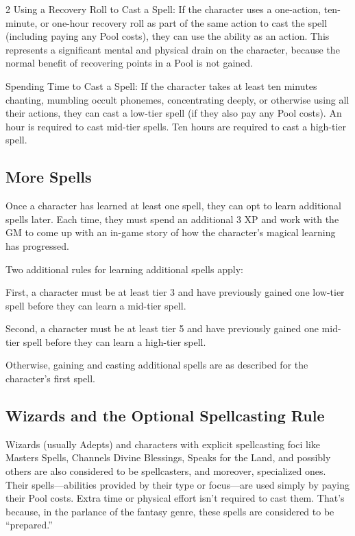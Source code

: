 \begin{multicols}{2}
Using a Recovery Roll to Cast a Spell: If the character uses a one-action, ten-minute, or one-hour recovery roll as part of the same action to cast the spell (including paying any Pool costs), they can use the ability as an action. This represents a significant mental and physical drain on the character, because the normal benefit of recovering points in a Pool is not gained.

Spending Time to Cast a Spell: If the character takes at least ten minutes chanting, mumbling occult phonemes, concentrating deeply, or otherwise using all their actions, they can cast a low-tier spell (if they also pay any Pool costs). An hour is required to cast mid-tier spells. Ten hours are required to cast a high-tier spell.

\subsection{More Spells}

Once a character has learned at least one spell, they can opt to learn additional spells later. Each time, they must spend an additional 3 XP and work with the GM to come up with an in-game story of how the character’s magical learning has progressed. 

Two additional rules for learning additional spells apply:

First, a character must be at least tier 3 and have previously gained one low-tier spell before they can learn a mid-tier spell.

Second, a character must be at least tier 5 and have previously gained one mid-tier spell before they can learn a high-tier spell.

Otherwise, gaining and casting additional spells are as described for the character’s first spell.

\subsection{Wizards and the Optional Spellcasting Rule}

Wizards (usually Adepts) and characters with explicit spellcasting foci like Masters Spells, Channels Divine Blessings, Speaks for the Land, and possibly others are also considered to be spellcasters, and moreover, specialized ones. Their spells—abilities provided by their type or focus—are used simply by paying their Pool costs. Extra time or physical effort isn’t required to cast them. That’s because, in the parlance of the fantasy genre, these spells are considered to be “prepared.”


\end{multicols}
